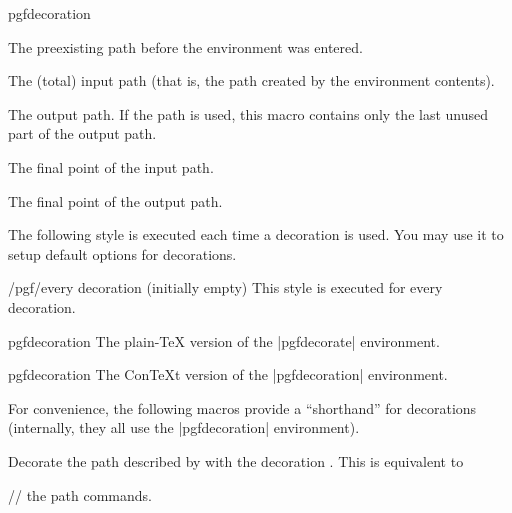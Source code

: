 \begin{environment}{{pgfdecoration}}
  \begin{command}{\pgfdecorateexistingpath}
    The preexisting path before the environment was entered.
  \end{command}
	
  \begin{command}{\pgfdecoratedpath}
    The (total) input path (that is, the path created by the environment contents).
  \end{command}
	
  \begin{command}{\pgfdecorationpath}
    The output path. If the path is used, this macro contains only the
    last unused part of the output path.
  \end{command}
	
  \begin{command}{\pgfpointdecoratedpathlast}
    The final point of the input path.
  \end{command}

  \begin{command}{\pgfpointdecorationpathlast}
    The final point of the output path.
  \end{command}

  The following style is executed each time a decoration is used. You
  may use it to setup default options for decorations.
  \begin{stylekey}{/pgf/every decoration (initially \normalfont empty)}
    This style is executed for every decoration.
  \end{stylekey}
\end{environment}

\begin{plainenvironment}{{pgfdecoration}}
  The plain-\TeX{} version of the |{pgfdecorate}| environment.      %
\end{plainenvironment}

\begin{contextenvironment}{{pgfdecoration}}
  The Con\TeX t version of the |{pgfdecoration}| environment.
\end{contextenvironment}

For convenience, the following macros provide a ``shorthand''
for decorations (internally, they all use the |{pgfdecoration}|
environment).

\begin{command}{\pgfdecoratepath{}}
  Decorate the path described by  with the
  decoration . This is equivalent to
\begin{codeexample}
  // the path commands.
\endpgfdecorate
\end{codeexample}
\end{command}

